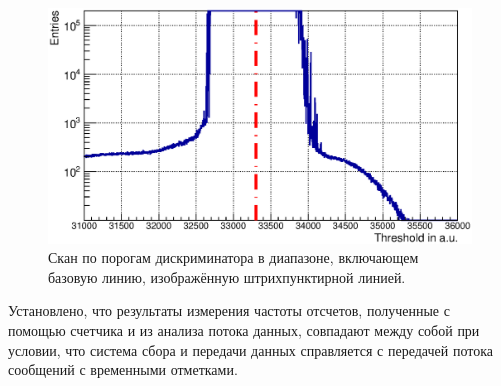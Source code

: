 

\begin{figure}[H]
\centering
\includegraphics[width=1.0\textwidth]{pictures/31_cMean12.eps}
\caption{Скан по порогам дискриминатора в диапазоне, включающем базовую линию, изображённую штрихпунктирной линией.}
\label{fig:TDCscalerScan}
\end{figure}

Установлено, что результаты измерения частоты отсчетов, полученные с помощью счетчика и из анализа потока данных, совпадают между собой при условии, что система сбора и передачи данных справляется с передачей потока сообщений с временными отметками.

